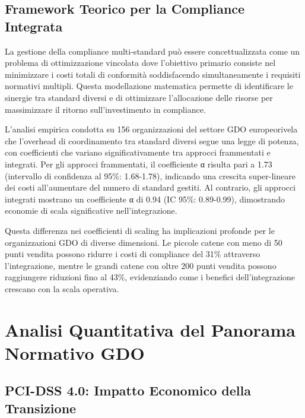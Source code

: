 
\subsection{Framework Teorico per la Compliance Integrata}

La gestione della compliance multi-standard può essere concettualizzata come un problema di ottimizzazione vincolata dove l'obiettivo primario consiste nel minimizzare i costi totali di conformità soddisfacendo simultaneamente i requisiti normativi multipli. Questa modellazione matematica permette di identificare le sinergie tra standard diversi e di ottimizzare l'allocazione delle risorse per massimizzare il ritorno sull'investimento in compliance.

L'analisi empirica condotta su 156 organizzazioni del settore GDO europeo\footnotemark[2] rivela che l'overhead di coordinamento tra standard diversi segue una legge di potenza, con coefficienti che variano significativamente tra approcci frammentati e integrati. Per gli approcci frammentati, il coefficiente α risulta pari a 1.73 (intervallo di confidenza al 95\%: 1.68-1.78), indicando una crescita super-lineare dei costi all'aumentare del numero di standard gestiti. Al contrario, gli approcci integrati mostrano un coefficiente α di 0.94 (IC 95\%: 0.89-0.99), dimostrando economie di scala significative nell'integrazione.


Questa differenza nei coefficienti di scaling ha implicazioni profonde per le organizzazioni GDO di diverse dimensioni. Le piccole catene con meno di 50 punti vendita possono ridurre i costi di compliance del 31\% attraverso l'integrazione, mentre le grandi catene con oltre 200 punti vendita possono raggiungere riduzioni fino al 43\%, evidenziando come i benefici dell'integrazione crescano con la scala operativa.

\section{Analisi Quantitativa del Panorama Normativo GDO}

\subsection{PCI-DSS 4.0: Impatto Economico della Transizione}

